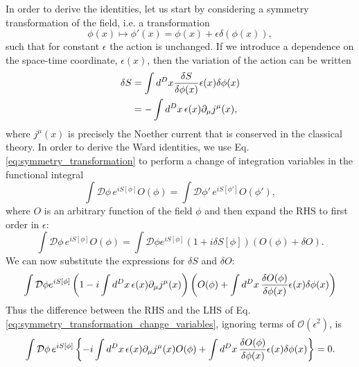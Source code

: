 \documentclass{article}
\numberwithin{equation}{section}
\begin{document}
In order to derive the identities, let us start by considering a symmetry transformation of the field, i.e. a transformation
\begin{equation} \label{eq:symmetry_transformation}
    \phi(x) \mapsto \phi'(x) = \phi(x) + \epsilon\delta(\phi(x)),
\end{equation}
such that for constant $\epsilon$ the action is unchanged. If we introduce a dependence on the space-time coordinate, $\epsilon(x)$, then the variation of the action can be written 
\begin{equation}
\begin{aligned}
    \delta S &= \int d^Dx \fdv{S}{\phi(x)} \epsilon(x) \delta\phi(x) \\
    &= -\int d^Dx \, \epsilon(x) \partial_\mu j^\mu(x),
\end{aligned}
\end{equation}
where $j^\mu(x)$ is precisely the Noether current that is conserved in the classical theory. %
In order to derive the Ward identities, we use Eq. \ref{eq:symmetry_transformation} to perform a change of integration variables in the functional integral
\begin{equation} \label{eq:symmetry_transformation_change_variables}
    \int \mathcal{D}\phi \, e^{iS[\phi]} O(\phi) = \int \mathcal{D}\phi' \, e^{iS[\phi']} O(\phi'),
\end{equation}
where $O$ is an arbitrary function of the field $\phi$ and then expand the RHS to first order in $\epsilon$:
\begin{equation} 
    \int \mathcal{D} \phi \, e^{iS[\phi]} O(\phi) = \int \mathcal{D}\phi e^{iS[\phi]} \left(1 + i\delta S[\phi]\right) \left(O(\phi) + \delta O\right).
\end{equation}
We can now substitute the expressions for $\delta S$ and $\delta O$:
\begin{equation}
    \int \mathcal{D}\phi e^{iS[\phi]} \left(1 - i\int d^Dx \, \epsilon(x) \partial_\mu j^\mu(x)\right) \left(O(\phi) + \int d^Dx \, \fdv{O(\phi)}{\phi(x)}\epsilon(x) \delta \phi(x)\right)
\end{equation}
Thus the difference between the RHS and the LHS of Eq. \ref{eq:symmetry_transformation_change_variables}, ignoring terms of $\mathcal{O}(\epsilon^2)$, is 
\begin{equation}
    \int \mathcal{D}\phi \, e^{iS[\phi]} \left\{-i \int d^Dx \, \epsilon(x) \partial_\mu j^\mu(x) O(\phi) + \int d^Dx \, \fdv{O(\phi)}{\phi(x)} \epsilon(x) \delta \phi(x)\right\} = 0.
\end{equation}
\end{document}
